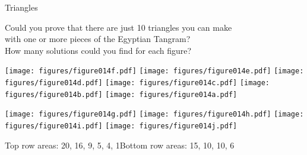 \documentclass[14pt]{beamer}
\begin{document}

    \begin{frame}{Triangles}

        \vspace{-0.5em}
        \begin{center}
            {\small Could you prove that there are just 10 triangles you can make\\with one or more pieces of the Egyptian Tangram?\\How many solutions could you find for each figure?}

            \bigskip\bigskip

            \texttt{[image: figures/figure014f.pdf]}\quad
            \texttt{[image: figures/figure014e.pdf]}\quad
            \texttt{[image: figures/figure014d.pdf]}\quad
            \texttt{[image: figures/figure014c.pdf]}\quad
            \texttt{[image: figures/figure014b.pdf]}\quad
            \texttt{[image: figures/figure014a.pdf]}\\\bigskip\bigskip

            \texttt{[image: figures/figure014g.pdf]}\quad
            \texttt{[image: figures/figure014h.pdf]}\quad
            \texttt{[image: figures/figure014i.pdf]}\quad
            \texttt{[image: figures/figure014j.pdf]}\\

            \bigskip

            {\footnotesize Top row areas: 20, 16, 9, 5, 4, 1\qquad Bottom row areas: 15, 10, 10, 6}
        \end{center}
    \end{frame}

\end{document}
